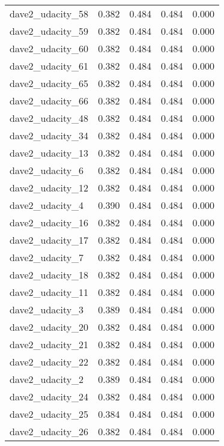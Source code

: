 \begin{tabular}{lrrrr}
dave2\_udacity\_58 &          0.382 &   0.484 &   0.484 &  0.000 \\
dave2\_udacity\_59 &          0.382 &   0.484 &   0.484 &  0.000 \\
dave2\_udacity\_60 &          0.382 &   0.484 &   0.484 &  0.000 \\
dave2\_udacity\_61 &          0.382 &   0.484 &   0.484 &  0.000 \\
dave2\_udacity\_65 &          0.382 &   0.484 &   0.484 &  0.000 \\
dave2\_udacity\_66 &          0.382 &   0.484 &   0.484 &  0.000 \\
dave2\_udacity\_48 &          0.382 &   0.484 &   0.484 &  0.000 \\
dave2\_udacity\_34 &          0.382 &   0.484 &   0.484 &  0.000 \\
dave2\_udacity\_13 &          0.382 &   0.484 &   0.484 &  0.000 \\
dave2\_udacity\_6  &          0.382 &   0.484 &   0.484 &  0.000 \\
dave2\_udacity\_12 &          0.382 &   0.484 &   0.484 &  0.000 \\
dave2\_udacity\_4  &          0.390 &   0.484 &   0.484 &  0.000 \\
dave2\_udacity\_16 &          0.382 &   0.484 &   0.484 &  0.000 \\
dave2\_udacity\_17 &          0.382 &   0.484 &   0.484 &  0.000 \\
dave2\_udacity\_7  &          0.382 &   0.484 &   0.484 &  0.000 \\
dave2\_udacity\_18 &          0.382 &   0.484 &   0.484 &  0.000 \\
dave2\_udacity\_11 &          0.382 &   0.484 &   0.484 &  0.000 \\
dave2\_udacity\_3  &          0.389 &   0.484 &   0.484 &  0.000 \\
dave2\_udacity\_20 &          0.382 &   0.484 &   0.484 &  0.000 \\
dave2\_udacity\_21 &          0.382 &   0.484 &   0.484 &  0.000 \\
dave2\_udacity\_22 &          0.382 &   0.484 &   0.484 &  0.000 \\
dave2\_udacity\_2  &          0.389 &   0.484 &   0.484 &  0.000 \\
dave2\_udacity\_24 &          0.382 &   0.484 &   0.484 &  0.000 \\
dave2\_udacity\_25 &          0.384 &   0.484 &   0.484 &  0.000 \\
dave2\_udacity\_26 &          0.382 &   0.484 &   0.484 &  0.000 \\

\end{tabular}
